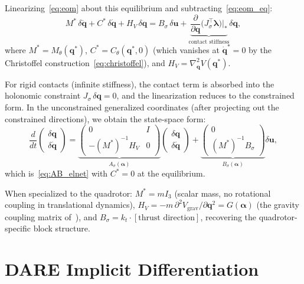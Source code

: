 \documentclass[letterpaper, 10pt, conference]{IEEEtran}
\newcommand{\balpha}{\bm{\alpha}}
\newcommand{\bu}{\bm{u}}
\newcommand{\bq}{\bm{q}}
\begin{document}
Linearizing~\eqref{eq:eom} about this equilibrium
and subtracting~\eqref{eq:eom_eq}:
\begin{equation}\label{eq:eom_lin}
  M^* \, \delta\ddot{\bq}
  + C^* \, \delta\dot{\bq}
  + H_V \, \delta\bq
  = B_\sigma \, \delta\bu
  + \underbrace{
    \frac{\partial}{\partial \bq}
    \bigl(J_\sigma^\top \bm{\lambda}\bigr)
    \Big|_{*}}_{\text{contact stiffness}} \delta\bq,
\end{equation}
where $M^* = M_\theta(\bq^*)$,
$C^* = C_\theta(\bq^*, 0)$ (which vanishes at
$\dot{\bq}^* = 0$ by the Christoffel
construction~\eqref{eq:christoffel}),
and $H_V = \nabla^2_{\bq} V(\bq^*)$.

For rigid contacts (infinite stiffness), the contact
term is absorbed into the holonomic constraint
$J_\sigma \, \delta\bq = 0$, and the linearization
reduces to the constrained form.
In the unconstrained generalized coordinates
(after projecting out the constrained directions),
we obtain the state-space form:
\[
  \frac{d}{dt}
  \begin{pmatrix} \delta\bq \\ \delta\dot{\bq} \end{pmatrix}
  =
  \underbrace{
  \begin{pmatrix}
    0 & I \\
    -(M^*)^{-1} H_V & 0
  \end{pmatrix}
  }_{A_\sigma(\balpha)}
  \begin{pmatrix} \delta\bq \\ \delta\dot{\bq} \end{pmatrix}
  +
  \underbrace{
  \begin{pmatrix}
    0 \\
    (M^*)^{-1} B_\sigma
  \end{pmatrix}
  }_{B_\sigma(\balpha)}
  \delta\bu,
\]
which is~\eqref{eq:AB_elnet} with $C^* = 0$ at the equilibrium.

When specialized to the quadrotor:
$M^* = m I_3$ (scalar mass, no rotational coupling in
translational dynamics),
$H_V = -m \, \partial^2 V_{\mathrm{grav}}/\partial \bq^2
       = G(\balpha)$ (the gravity coupling matrix
of~\cite[Eq.~(5)]{zhang2025flat}),
and $B_\sigma = k_t \cdot [\text{thrust direction}]$,
recovering the quadrotor-specific block structure.

\section{DARE Implicit Differentiation}\label{app:dare_diff}
\end{document}

